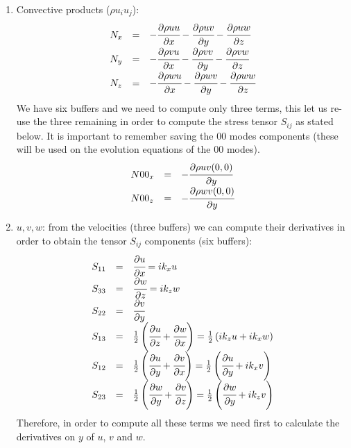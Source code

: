 \documentclass[titlepage,11pt]{article}
\newcommand\ppx[1]{\cfrac{\partial#1}{\partial x}} %
\newcommand\ppy[1]{\cfrac{\partial#1}{\partial y}} %
\newcommand\ppz[1]{\cfrac{\partial#1}{\partial z}} %
\begin{document}
\begin{enumerate}
\begin{enumerate}
	\item Convective products ($\rho u_i u_j$):
		\begin{equation}
			\begin{array}{lcl}
				N_{x}&=&-\ppx{\rho u u}- \ppy{\rho u v}-\ppz{\rho u w}\\
				N_{y}&=&-\ppx{\rho v u}- \ppy{\rho v v}-\ppz{\rho v w}\\
				N_{z}&=&-\ppx{\rho w u}- \ppy{\rho w v}-\ppz{\rho w w}
			\end{array}
		\end{equation}
		We have six buffers  and we need to compute only three terms, this let us re-use the three remaining in order to compute the stress tensor $S_{ij}$ as stated below.  It is important to remember saving the 00 modes components (these will be used on the evolution equations of the 00 modes).
		\begin{equation}
			\begin{array}{lcl}
				N00_{x}&=&- \ppy{\rho u v (0,0)}\\
				N00_{z}&=&- \ppy{\rho w v (0,0)}
			\end{array}
		\end{equation}


	\item $u,v,w$: from the velocities (three buffers) we can compute their derivatives in order to obtain the tensor $S_{ij}$ components (six buffers):
		\begin{equation}
			\begin{array}{lcl}
				S_{11}&=&\ppx{u}=i k_x u \\
                                      S_{33}&=&\ppz{w}=i k_z w \\
				S_{22}&=&\ppy{v} \\
                         		S_{13}&=& \frac{1}{2}\left(\ppz{u}+\ppx{w}\right)=\frac{1}{2}\left( i k_z u+ i k_x w \right) \\
				S_{12}&=& \frac{1}{2}\left(\ppy{u}+\ppx{v} \right)=\frac{1}{2}\left( \ppy{u}+ i k_x v \right) \\
				S_{23}&=& \frac{1}{2}\left(\ppy{w}+\ppz{v} \right)=\frac{1}{2}\left( \ppy{w}+ i k_z v \right) 
			\end{array}
		\end{equation}
     Therefore, in order to compute all these terms we need first to calculate the derivatives on $y$ of $u$, $v$ and $w$. 
\end{enumerate}
	

\end{enumerate}
\end{document}
